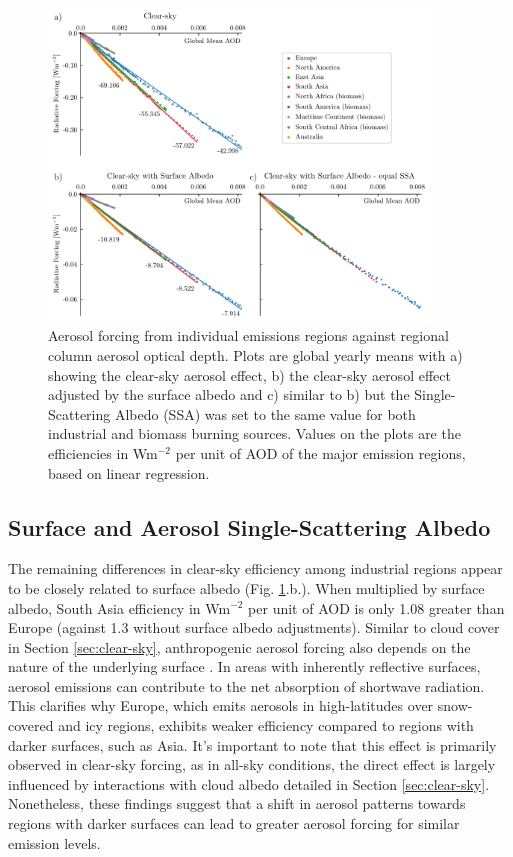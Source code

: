 \documentclass[draft]{agujournal2019}
\begin{document}
      \begin{figure}
            \centering
            \includegraphics[width=0.9\textwidth]{../../figures/figure4}
            \caption{Aerosol forcing from individual emissions regions against regional column aerosol optical depth. Plots are global yearly means with a) showing the clear-sky aerosol effect, b) the clear-sky aerosol effect adjusted by the surface albedo and c) similar to b) but the Single-Scattering Albedo (SSA) was set to the same value for both industrial and biomass burning sources. Values on the plots are the efficiencies in Wm$^{-2}$ per unit of AOD of the major emission regions, based on linear regression.}
            \label{fig:figure4}
      \end{figure}

      \subsection{Surface and Aerosol Single-Scattering Albedo}

            The remaining differences in clear-sky efficiency among industrial regions appear to be closely related to surface albedo (Fig. \ref{fig:figure4}.b.). When multiplied by surface albedo, South Asia efficiency in Wm$^{-2}$ per unit of AOD is only 1.08 greater than Europe (against 1.3 without surface albedo adjustments). Similar to cloud cover in Section \ref{sec:clear-sky}, anthropogenic aerosol forcing also depends on the nature of the underlying surface \cite{Li_2022}. In areas with inherently reflective surfaces, aerosol emissions can contribute to the net absorption of shortwave radiation. This clarifies why Europe, which emits aerosols in high-latitudes over snow-covered and icy regions, exhibits weaker efficiency compared to regions with darker surfaces, such as Asia. It's important to note that this effect is primarily observed in clear-sky forcing, as in all-sky conditions, the direct effect is largely influenced by interactions with cloud albedo detailed in Section \ref{sec:clear-sky}. Nonetheless, these findings suggest that a shift in aerosol patterns towards regions with darker surfaces can lead to greater aerosol forcing for similar emission levels.
            
\end{document}
